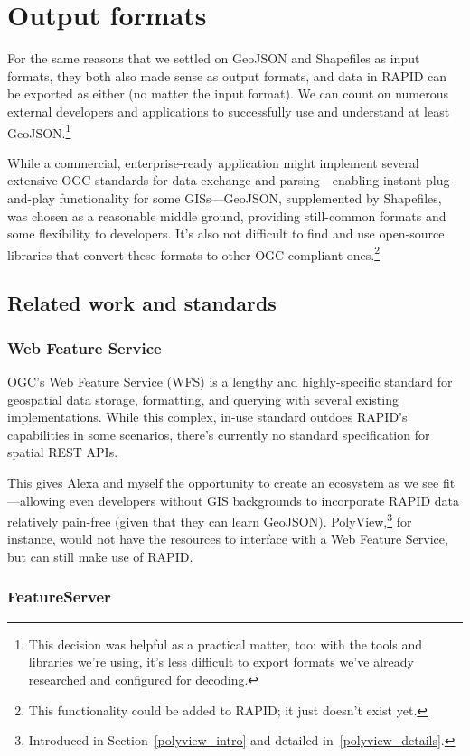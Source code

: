 \section{Output formats}
For the same reasons that we settled on GeoJSON and Shapefiles as input formats, they both also made sense as output formats, and data in RAPID can be exported as either (no matter the input format). We can count on numerous external developers and applications to successfully use and understand at least GeoJSON.\footnote{This decision was helpful as a practical matter, too: with the tools and libraries we're using, it's less difficult to export formats we've already researched and configured for decoding.}

While a commercial, enterprise-ready application might implement several extensive OGC standards for data exchange and parsing---enabling instant plug-and-play functionality for some GISs---GeoJSON, supplemented by Shapefiles, was chosen as a reasonable middle ground, providing still-common formats and some flexibility to developers. It's also not difficult to find and use open-source libraries that convert these formats to other OGC-compliant ones.\footnote{This functionality could be added to RAPID; it just doesn't exist yet.}

\subsection{Related work and standards}
\subsubsection{Web Feature Service}
OGC's Web Feature Service (WFS) is a lengthy and highly-specific standard for geospatial data storage, formatting, and querying with several existing implementations. While this complex, in-use standard outdoes RAPID's capabilities in some scenarios, there's currently no standard specification for spatial REST APIs.

This gives Alexa and myself the opportunity to create an ecosystem as we see fit---allowing even developers without GIS backgrounds to incorporate RAPID data relatively pain-free (given that they can learn GeoJSON). PolyView,\footnote{Introduced in Section~\ref{polyview_intro} and detailed in~\ref{polyview_details}.} for instance, would not have the resources to interface with a Web Feature Service, but can still make use of RAPID.

\subsubsection{FeatureServer}

